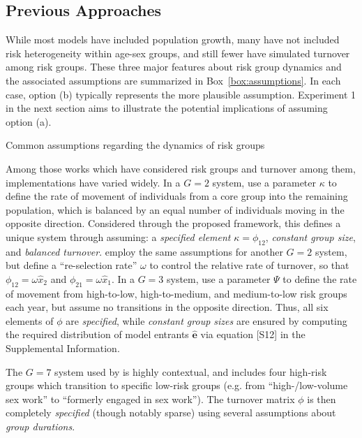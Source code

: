 \subsection{Previous Approaches}
While most models have included population growth,
many have not included risk heterogeneity within age-sex groups,
and still fewer have simulated turnover among risk groups.
These three major features about risk group dynamics and the associated assumptions
are summarized in Box~\ref{box:assumptions}.
In each case, option (b) typically represents the more plausible assumption.
Experiment 1 in the next section
aims to illustrate the potential implications of assuming option (a).
\begin{floatbox}
  \caption{Common assumptions regarding the dynamics of risk groups}
  \label{box:assumptions}
  
\end{floatbox}
\par
Among those works which have considered risk groups and turnover among them,
implementations have varied widely.
In a $G = 2$ system,
\citet{Stigum1994} use a parameter $\kappa$ to define
the rate of movement of individuals from a core group into the remaining population,
which is balanced by an equal number of individuals moving in the opposite direction.
Considered through the proposed framework,
this defines a unique system through assuming:
a \emph{specified element} $\kappa = \phi_{12}$,
\emph{constant group size}, and \emph{balanced turnover}.
\citet{Henry2015} employ the same assumptions for another $G = 2$ system,
but define a ``re-selection rate'' $\omega$ to control
the relative rate of turnover, so that
$\phi_{12} = \omega \hat{x}_{2}$ and $\phi_{21} = \omega \hat{x}_{1}$.
In a $G = 3$ system,
\citet{Eaton2014} use a parameter $\Psi$ to define the rate of movement from
high-to-low, high-to-medium, and medium-to-low risk groups each year,
but assume no transitions in the opposite direction.
Thus, all six elements of $\phi$ are \emph{specified},
while \emph{constant group sizes} are ensured by computing
the required distribution of model entrants $\bm{\hat{e}}$
via equation [S12] in the Supplemental Information.
\par
The $G = 7$ system used by
\citet{Boily2015} is highly contextual, and
includes four high-risk groups which transition to specific low-risk groups
(e.g. from ``high-/low-volume sex work'' to ``formerly engaged in sex work'').
The turnover matrix $\phi$ is then completely \emph{specified} (though notably sparse)
using several assumptions about \emph{group durations}.
